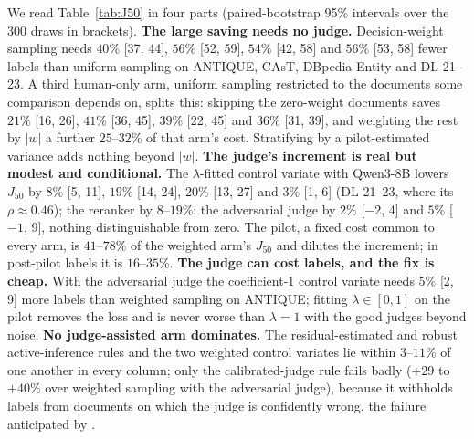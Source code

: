 \documentclass{article}
\newcommand{\Jfifty}{J_{50}}
\begin{document}
We read Table~\ref{tab:J50} in four parts (paired-bootstrap 95\% intervals over the 300 draws in brackets). \textbf{The large saving needs no judge.} Decision-weight sampling needs $40\%$ [37, 44], $56\%$ [52, 59], $54\%$ [42, 58] and $56\%$ [53, 58] fewer labels than uniform sampling on ANTIQUE, CAsT, DBpedia-Entity and DL 21--23. A third human-only arm, uniform sampling restricted to the documents some comparison depends on, splits this: skipping the zero-weight documents saves $21\%$ [16, 26], $41\%$ [36, 45], $39\%$ [22, 45] and $36\%$ [31, 39], and weighting the rest by $|w|$ a further $25$--$32\%$ of that arm's cost. Stratifying by a pilot-estimated variance adds nothing beyond $|w|$. \textbf{The judge's increment is real but modest and conditional.} The $\lambda$-fitted control variate with Qwen3-8B lowers $\Jfifty$ by $8\%$ [5, 11], $19\%$ [14, 24], $20\%$ [13, 27] and $3\%$ [1, 6] (DL 21--23, where its $\rho\approx0.46$); the reranker by $8$--$19\%$; the adversarial judge by $2\%$ [$-2$, 4] and $5\%$ [$-1$, 9], nothing distinguishable from zero. The pilot, a fixed cost common to every arm, is $41$--$78\%$ of the weighted arm's $\Jfifty$ and dilutes the increment; in post-pilot labels it is $16$--$35\%$. \textbf{The judge can cost labels, and the fix is cheap.} With the adversarial judge the coefficient-1 control variate needs $5\%$ [2, 9] more labels than weighted sampling on ANTIQUE; fitting $\lambda\in[0,1]$ on the pilot removes the loss and is never worse than $\lambda=1$ with the good judges beyond noise. \textbf{No judge-assisted arm dominates.} The residual-estimated and robust active-inference rules and the two weighted control variates lie within $3$--$11\%$ of one another in every column; only the calibrated-judge rule fails badly ($+29$ to $+40\%$ over weighted sampling with the adversarial judge), because it withholds labels from documents on which the judge is confidently wrong, the failure anticipated by \citet{li2025robust}.
\end{document}
